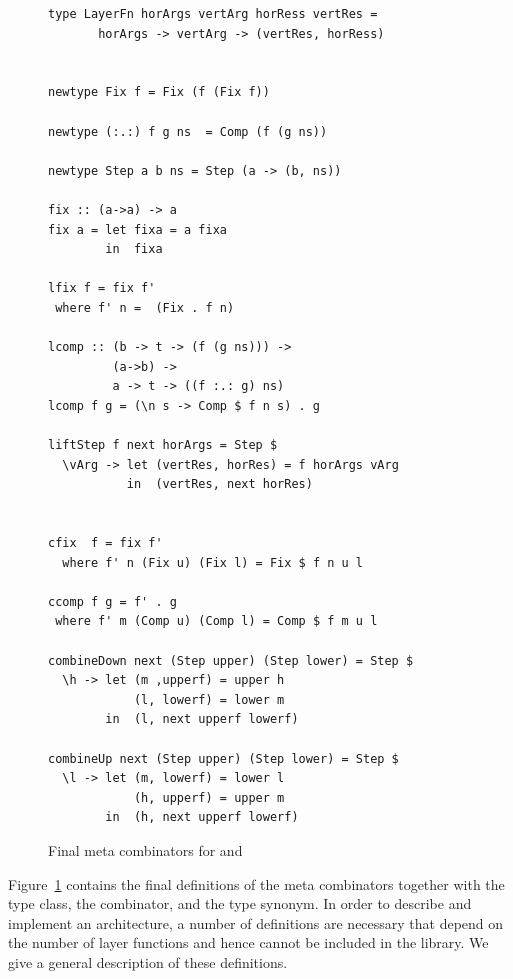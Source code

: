 \documentclass[preprint,natbib]{sigplanconf}
\begin{document}
\begin{figure}
\begin{small}
\begin{center}
\begin{footnotesize}
\begin{verbatim}
type LayerFn horArgs vertArg horRess vertRes =
       horArgs -> vertArg -> (vertRes, horRess)


newtype Fix f = Fix (f (Fix f))

newtype (:.:) f g ns  = Comp (f (g ns))

newtype Step a b ns = Step (a -> (b, ns))

fix :: (a->a) -> a
fix a = let fixa = a fixa
        in  fixa

lfix f = fix f' 
 where f' n =  (Fix . f n) 

lcomp :: (b -> t -> (f (g ns))) -> 
         (a->b) -> 
         a -> t -> ((f :.: g) ns)
lcomp f g = (\n s -> Comp $ f n s) . g

liftStep f next horArgs = Step $ 
  \vArg -> let (vertRes, horRes) = f horArgs vArg
           in  (vertRes, next horRes)


cfix  f = fix f' 
  where f' n (Fix u) (Fix l) = Fix $ f n u l

ccomp f g = f' . g
 where f' m (Comp u) (Comp l) = Comp $ f m u l

combineDown next (Step upper) (Step lower) = Step $
  \h -> let (m ,upperf) = upper h
            (l, lowerf) = lower m
        in  (l, next upperf lowerf)   

combineUp next (Step upper) (Step lower) = Step $ 
  \l -> let (m, lowerf) = lower l
            (h, upperf) = upper m
        in  (h, next upperf lowerf)   
\end{verbatim} %
\end{footnotesize}\caption{Final meta combinators for  and }\label{metacombinators} 
\end{center}
\end{small}
\end{figure}


Figure~\ref{metacombinators} contains the final definitions of the meta combinators together with the  type class, the  combinator, and the  type synonym. In order to describe and implement an architecture, a number of definitions are necessary that depend on the number of layer functions and hence cannot be included in the library. We give a general description of these definitions.
\end{document}

